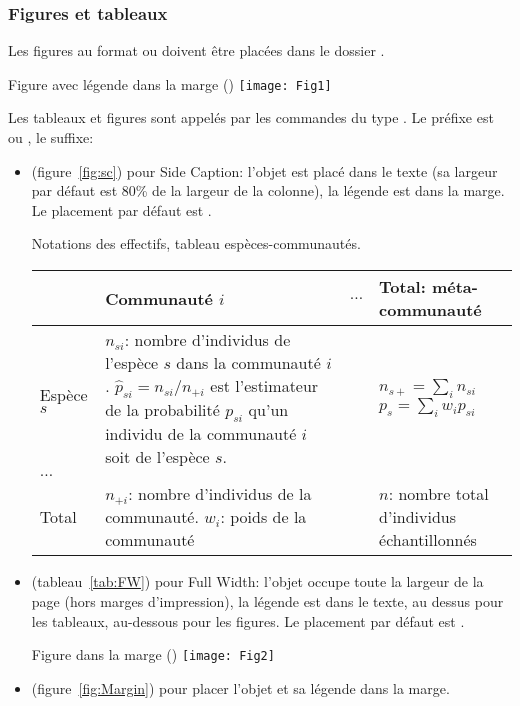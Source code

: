 \documentclass[
  a4paper, %
  11pt, extrafontsizes, %
  onecolumn, %
  openright, %
]{memoir}
\begin{document}
\subsubsection{Figures et tableaux}

Les figures au format  ou  doivent être placées dans le dossier .

  {Figure avec légende dans la marge ()}
  {\texttt{[image: Fig1]}}

Les tableaux et figures sont appelés par les commandes du type . Le préfixe est  ou , le suffixe:
\begin{itemize}
  \item {} (figure~\ref{fig:sc}) pour \foreignlanguage{english}{Side Caption}: l'objet est placé dans le texte (sa largeur par défaut est 80\% de la largeur de la colonne), la légende est dans la marge. Le placement par défaut est \code{[htbp]}.

{Notations des effectifs, tableau espèces-communautés.}
{
\begin{tabularx}{\textwidth}{p{2cm} p{7cm} p{1cm} X}
\toprule
 & Communauté $i$ & $\dots$ & Total: méta-communauté \\

\midrule
Espèce $s$ 
   & $n_{si}$: nombre d'individus de l'espèce $s$ dans la communauté $i$. \newline
  $\hat{p}_{si}=n_{si}/n_{+i}$ est l'estimateur de la probabilité $p_{si}$ qu'un individu de la communauté $i$ soit de l'espèce $s$.
  &
  & $n_{s+}=\sum_i{n_{si}}$ \newline
    $p_s=\sum_i{w_{i}p_{si}}$ \\

$\dots$
  &
  &
  & \\

Total
  & $n_{+i}$: nombre d'individus de la communauté.\newline 
    $w_i$: poids de la communauté
  &
  & $n$: nombre total d'individus échantillonnés \\

\bottomrule
\end{tabularx}
}

  \item {} (tableau~\ref{tab:FW}) pour \foreignlanguage{english}{Full Width}: l'objet occupe toute la largeur de la page (hors marges d'impression), la légende est dans le texte, au dessus pour les tableaux, au-dessous pour les figures. Le placement par défaut est \code{[tbp]}.

  {Figure dans la marge ()}
  {\texttt{[image: Fig2]}}

  \item  {} (figure~\ref{fig:Margin}) pour placer l'objet et sa légende dans la marge.
\end{itemize}
\end{document}
